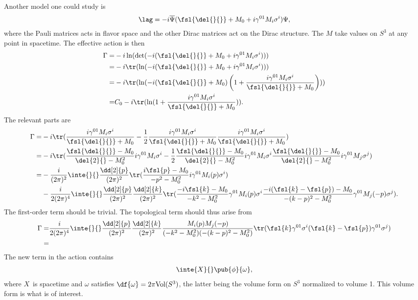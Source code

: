 Another model one could study is
\begin{align*}
	\lag = -i\overline{\Psi}(\fsl{\del{}{}} + M_{0} + i\gamma^{01}M_{i}\sigma^{i})\Psi,
\end{align*}
where the Pauli matrices acts in flavor space and the other Dirac matrices act on the Dirac structure. The $M$ take values on $S^{3}$ at any point in spacetime. The effective action is then
\begin{align*}
	\Gamma =& -i\ln(\det(-i(\fsl{\del{}{}} + M_{0} + i\gamma^{01}M_{i}\sigma^{i}))) \\
	       =& -i\tr(\ln(-i(\fsl{\del{}{}} + M_{0} + i\gamma^{01}M_{i}\sigma^{i}))) \\
	       =& -i\tr(\ln(-i(\fsl{\del{}{}} + M_{0})\left(1 + \frac{i\gamma^{01}M_{i}\sigma^{i}}{\fsl{\del{}{}} + M_{0}}\right))) \\
	       =& C_{0} - i\tr(\ln(1 + \frac{i\gamma^{01}M_{i}\sigma^{i}}{\fsl{\del{}{}} + M_{0}})).
\end{align*}
The relevant parts are
\begin{align*}
	\Gamma =& -i\tr(\frac{i\gamma^{01}M_{i}\sigma^{i}}{\fsl{\del{}{}} + M_{0}} - \frac{1}{2}\frac{i\gamma^{01}M_{i}\sigma^{i}}{\fsl{\del{}{}} + M_{0}}\frac{i\gamma^{01}M_{i}\sigma^{i}}{\fsl{\del{}{}} + M_{0}}) \\
	       =& -i\tr(\frac{\fsl{\del{}{}} - M_{0}}{\del{2}{} - M_{0}^{2}}i\gamma^{01}M_{i}\sigma^{i} - \frac{1}{2}\frac{\fsl{\del{}{}} - M_{0}}{\del{2}{} - M_{0}^{2}}i\gamma^{01}M_{i}\sigma^{i}\frac{\fsl{\del{}{}} - M_{0}}{\del{2}{} - M_{0}^{2}}i\gamma^{01}M_{j}\sigma^{j}) \\
	       =& -\frac{i}{(2\pi)^{2}}\inte{}{}\frac{\dd[2]{p}}{(2\pi)^{2}}\tr(\frac{i\fsl{p} - M_{0}}{-p^{2} - M_{0}^{2}}i\gamma^{01}M_{i}(p)\sigma^{i}) \\
	        &- \frac{i}{2(2\pi)^{4}}\inte{}{}\frac{\dd[2]{p}}{(2\pi)^{2}}\frac{\dd[2]{k}}{(2\pi)^{2}}\tr(\frac{-i\fsl{k} - M_{0}}{-k^{2} - M_{0}^{2}}\gamma^{01}M_{i}(p)\sigma^{i}\frac{-i(\fsl{k} - \fsl{p}) - M_{0}}{-(k - p)^{2} - M_{0}^{2}}\gamma^{01}M_{j}(-p)\sigma^{j}).
\end{align*}
The first-order term should be trivial. The topological term should thus arise from
\begin{align*}
	\Gamma =& \frac{i}{2(2\pi)^{4}}\inte{}{}\frac{\dd[2]{p}}{(2\pi)^{2}}\frac{\dd[2]{k}}{(2\pi)^{2}}\frac{M_{i}(p)M_{j}(-p)}{(-k^{2} - M_{0}^{2})(-(k - p)^{2} - M_{0}^{2})}\tr(\fsl{k}\gamma^{01}\sigma^{i}(\fsl{k} - \fsl{p})\gamma^{01}\sigma^{j}) \\
	=&
\end{align*}
The new term in the action contains
\begin{align*}
	\inte{X}{}\pub{\phi}{\omega},
\end{align*}
where $X$ is spacetime and $\omega$ satisfies $\df{\omega} = 2\pi\text{Vol}(S^{3})$, the latter being the volume form on $S^{3}$ normalized to volume 1. This volume form is what is of interest.

